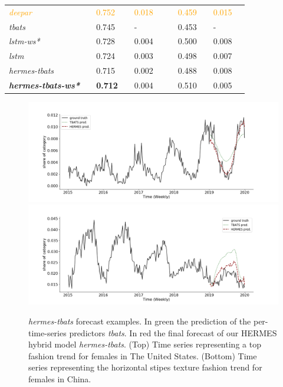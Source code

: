 \documentclass[10pt]{article} %
\begin{document}
\begin{table}
\begin{tabular}{l||lllll|lllll}
     \textcolor{orange}{\textit{deepar}} && \textcolor{orange}{0.752} && \textcolor{orange}{0.018} &&& \textcolor{orange}{0.459} && \textcolor{orange}{0.015}\\
     \textit{tbats} && 0.745 && -&&& 0.453 && - & \\
     \textit{lstm-ws*} && 0.728 && 0.004 &&& 0.500 && 0.008 &\\
     \textit{lstm} && 0.724 && 0.003 &&& 0.498 && 0.007 &\\
     \textit{hermes-tbats} && 0.715 && 0.002 &&& 0.488 && 0.008 &\\
     \textbf{\textit{hermes-tbats-ws*}} && \textbf{0.712} && 0.004 &&& 0.510 && 0.005 &\\
  \end{tabular}
\label{tab:metricresults}
\end{table}

\begin{figure}
\centering
  \includegraphics[width=1.\linewidth]{us_female_top}
  \includegraphics[width=1.\linewidth]{cn_female_texture_horizontalstripe}
\caption{\textit{hermes-tbats} forecast examples. In green the prediction of the per-time-series predictors \textit{tbats}. In red the final forecast of our HERMES hybrid model \textit{hermes-tbats}. (Top) Time series representing a top fashion trend for females in The United States. (Bottom) Time series representing the horizontal stipes texture fashion trend for females in China.}
\label{fig:examples}
\end{figure}
\end{document}
